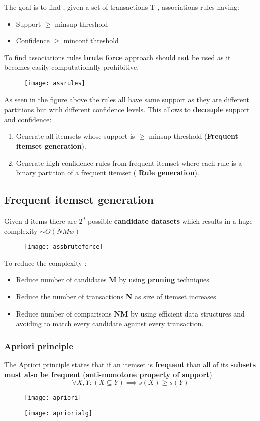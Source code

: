The goal is to find , given a set of transactions T , associations rules having:
\begin{itemize}
\item Support $\geq$ minsup threshold
\item Confidence $\geq$ minconf threshold
\end{itemize}
To find associations rules \textbf{brute force} approach should \textbf{not} be used as it becomes easily computationally prohibitive.
\begin{figure}[H]
  \centering
  \texttt{[image: assrules]}
\end{figure}
As seen in the figure above the rules all have same support as they are different partitions but with different confidence levels. This allows to \textbf{decouple} support and confidence:
\begin{enumerate}
\item Generate all itemsets whose support is $\geq$ minsup threshold (\textbf{Frequent itemset generation}).
\item Generate high confidence rules from frequent itemset where each rule is a binary partition of a frequent itemset ( \textbf{Rule generation}).
\end{enumerate}

\subsection{Frequent itemset generation}
Given d items there are $2^d$ possible \textbf{candidate datasets} which results in a huge complexity $\sim O(NMw)$
 \begin{figure}[H]
  \centering
  \texttt{[image: assbruteforce]}
\end{figure}
To reduce the complexity : 
\begin{itemize}
\item Reduce number of candidates \textbf{M} by using \textbf{pruning} techniques
\item Reduce the number of transactions  \textbf{N} as size of itemset increases
\item Reduce number of comparisons \textbf{NM} by using efficient data structures and avoiding to match every candidate against every transaction.
\end{itemize}

\subsubsection{Apriori principle}
The Apriori principle states that if an itemset is \textbf{frequent} than all of its \textbf{subsets must also be frequent} (\textbf{anti-monotone property of support}) $$ \forall X,Y : (X \subseteq Y) \implies s(X) \geq s(Y)$$ 
 \begin{figure}[H]
  \centering
  \texttt{[image: apriori]}
\end{figure}
 \begin{figure}[H]
  \centering
  \texttt{[image: apriorialg]}
\end{figure}

